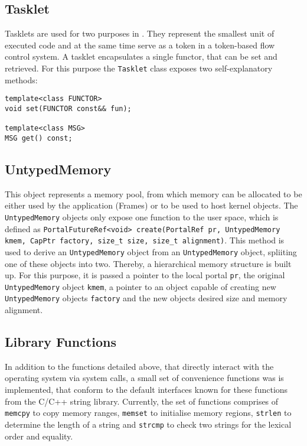 \subsection{Tasklet}
Tasklets are used for two purposes in \mythos. They represent the smallest unit
of executed code and at the same time serve as a token in a token-based flow
control system. A tasklet encapsulates a single functor, that can be set and
retrieved. For this purpose the \texttt{Tasklet} class exposes two
self-explanatory methods:

\lstset{language=c++}
\begin{lstlisting}
template<class FUNCTOR>
void set(FUNCTOR const&& fun);

template<class MSG>
MSG get() const;
\end{lstlisting}

\subsection{UntypedMemory}
This object represents a memory pool, from which memory can be allocated to be
either used by the application (Frames) or to be used to host kernel objects.
The \texttt{UntypedMemory} objects only expose one function to the user space,
which is defined as \texttt{PortalFutureRef<void> create(PortalRef pr,
UntypedMemory kmem, CapPtr factory, size\_t size, size\_t alignment)}. This
method is used to derive an \texttt{UntypedMemory} object from an
\texttt{UntypedMemory} object, spliiting one of these objects into two. Thereby,
a hierarchical memory structure is built up. For this purpose, it is passed a
pointer to the local portal \texttt{pr}, the original \texttt{UntypedMemory}
object \texttt{kmem}, a pointer to an object capable of creating new
\texttt{UntypedMemory} objects \texttt{factory} and the new objects desired size
and memory alignment.

\subsection{Library Functions} In addition to the functions detailed above, that
directly interact with the operating system via system calls, a small set of
convenience functions was is implemented, that conform to the default interfaces
known for these functions from the C/C++ string library. Currently, the set of
functions comprises of \texttt{memcpy} to copy memory ranges, \texttt{memset} to
initialise memory regions, \texttt{strlen} to determine the length of a string
and \texttt{strcmp} to check two strings for the lexical order and equality.

